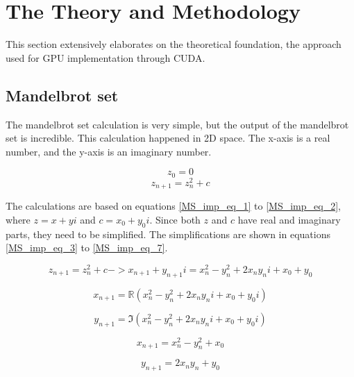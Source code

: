 \documentclass{article}
\begin{document}
\clearpage
\section{The Theory and Methodology} 
This section extensively elaborates on the theoretical foundation, the approach used for GPU implementation through CUDA.

\subsection{Mandelbrot set }
The mandelbrot set calculation is very simple, but the output of the mandelbrot set is incredible. This calculation happened in 2D space. The x-axis is a real number, and the y-axis is an imaginary number.     


\begin{equation}  
    z_0 = 0 
    \label{MS_imp_eq_1}
\end{equation}
\begin{equation}  
    z_{n+1} = z_n^2 + c 
    \label{MS_imp_eq_2}
\end{equation}

The calculations are based on equations \eqref{MS_imp_eq_1} to \eqref{MS_imp_eq_2}, where \(z = x+yi\) and \(c = x_0 + y_0i\). Since both \(z\) and \(c\) have real and imaginary parts, they need to be simplified. The simplifications are shown in equations \eqref{MS_imp_eq_3} to \eqref{MS_imp_eq_7}.


\begin{equation}  
    z_{n+1} = z_n^2 + c -> x_{n+1} + y_{n+1}i = x_n^2 - y_n^2 + 2x_ny_ni +x_0 + y_0 
    \label{MS_imp_eq_3}
\end{equation}

\begin{equation}  
    x_{n+1} = \mathbb{R}(x_n^2 - y_n^2 + 2x_ny_ni +x_0 + y_0i )
    \label{MS_imp_eq_4}
\end{equation}

\begin{equation}  
    y_{n+1} = \Im(x_n^2 - y_n^2 + 2x_ny_ni +x_0 + y_0i )
    \label{MS_imp_eq_5}
\end{equation}

\begin{equation}  
    x_{n+1} = x_n^2 - y_n^2 +x_0  
    \label{MS_imp_eq_6}
\end{equation}

\begin{equation}  
    y_{n+1} = 2x_ny_n+ y_0
    \label{MS_imp_eq_7}
\end{equation}
\end{document}
